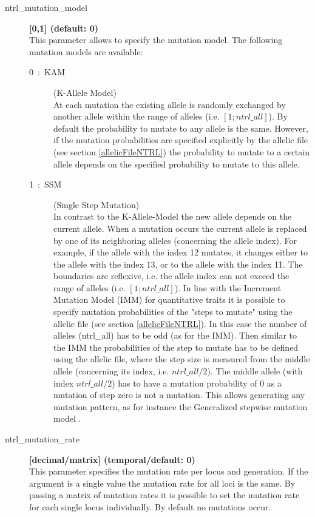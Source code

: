\documentclass[letterpaper,12pt,oneside]{book}
\begin{document}
\begin{description}
\item[ntrl\_mutation\_model] \textbf{[0,1] (default: 0)}\\
This parameter allows to specify the mutation model. The following mutation models are available:
\begin{description}
\item[0~:~KAM] (K-Allele Model)\\
At each mutation the existing allele is randomly exchanged by another allele within the range of alleles (i.e. $[1; ntrl\_all]$). By default the probability to mutate to any allele is the same. However, if the mutation probabilities are specified explicitly by the allelic file (see section \ref{allelicFileNTRL}) the probability to mutate to a certain allele depends on the specified probability to mutate to this allele.

\item[1~:~SSM] (Single Step Mutation)\\
In contrast to the K-Allele-Model the new allele depends on the current allele. When a mutation occurs the current allele is replaced by one of its neighboring alleles (concerning the allele index). For example, if the allele with the index 12 mutates, it changes either to the allele with the index 13, or to the allele with the index 11. The boundaries are reflexive, i.e. the allele index can not exceed the range of alleles (i.e. $[1; ntrl\_all]$). In line with the Increment Mutation Model (IMM) for quantitative traits it is possible to specify mutation probabilities of the "steps to mutate" using the allelic file (see section \ref{allelicFileNTRL}). In this case the number of alleles (\textsf{ntrl\_all}) has to be odd (as for the IMM). Then similar to the IMM the probabilities of the step to mutate has to be defined using the allelic file, where the step size is measured from the middle allele (concerning its index, i.e. $ntrl\_all/2$). The middle allele (with index $ntrl\_all/2$) has to have a mutation probability of 0 as a mutation of step zero is not a mutation. This allows generating any mutation pattern, as for instance the Generalized stepwise mutation model \citep{Estoup_2002}.
\end{description}

\item[ntrl\_mutation\_rate] \textbf{[decimal/matrix] (temporal/default: 0)}\\
This parameter specifies the mutation rate per locus and generation. If the argument is a single value the mutation rate for all loci is the same. By passing a matrix of mutation rates it is possible to set the mutation rate for each single locus individually. By default no mutations occur.
\end{description}
\end{document}
